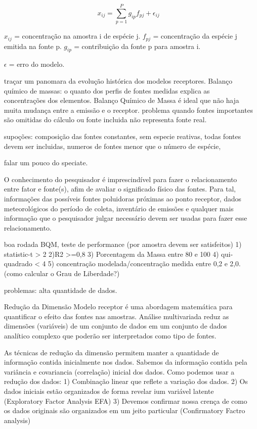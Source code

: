 \begin{equation}
  x_{ij} = \sum_{p=1}^{P} g_{ip}f_{pj} + \epsilon_{ij}
\end{equation} 

$x_{ij}$ = concentração na amostra i de espécie j.
$f_{pj}$ = concentração da espécie j emitida na fonte p. 
$g_{ip}$ = contribuição da fonte p para amostra i. 

$\epsilon$ = erro do modelo.

traçar um panomara da evolução histórica dos modelos receptores.
Balanço químico de massas: o quanto dos perfis de fontes medidas explica as concentrações dos elementos.
Balanço Químico de Massa
é ideal que não haja muita mudança entre a emissão e o receptor. problema quando fontes importantes são omitidas do cálculo ou fonte incluida não representa fonte real.

supoções: composição das fontes constantes, sem especie reativas, todas fontes devem ser incluidas, numeros de fontes menor que o número de espécie, 

falar um pouco do speciate. 

O conhecimento do pesquisador é imprescindível para fazer o relacionamento entre fator e fonte(s), afim de avaliar o significado físico das fontes. Para tal, informações das possíveis fontes poluidoras próximas ao ponto receptor, dados meteorológicos do período de coleta, inventário de emissões e qualquer mais informação que o pesquisador julgar necessário devem ser usadas para fazer esse relacionamento.

boa rodada BQM, teste de performance (por amostra devem ser satisfeitos)
1) statistic-t > 2
2)R2 >=0,8
3) Porcentagem da Massa entre 80 e 100 
4) qui-quadrado < 4
5) concentração modelada/concentração medida entre 0,2 e 2,0.  (como calcular o Grau de Liberdade?)

problemas: alta quantidade de dados.

Redução da Dimensão
Modelo receptor é uma abordagem matemática para quantificar o efeito das fontes nas amostras. 
Análise multivariada reduz as dimensões (variáveis) de um conjunto de dados em um conjunto de dados analítico complexo que poderão ser interpretados como tipo de fontes.


As técnicas de redução da dimensão permitem manter a quantidade de informação contida inicialmente nos dados. Sabemos da informação contida pela variância e covariancia (correlação) inicial dos dados. Como podemos usar a redução dos dados: 
1) Combinação linear que reflete a variação dos dados. 
2) Os dados iniciais estão organizados de forma revelar ium variável latente (Exploratory Factor Analysis EFA)
3) Devemos confirmar nossa crença de como os dados originais são organizados em um jeito particular (Confirmatory Factro analysis)

